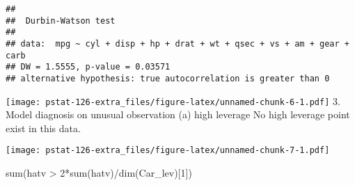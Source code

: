 \documentclass[
]{article}
\newenvironment{Shaded}{\begin{snugshade}}{\end{snugshade}}
\newcommand{\AttributeTok}[1]{\textcolor[rgb]{0.77,0.63,0.00}{#1}}
\newcommand{\ConstantTok}[1]{\textcolor[rgb]{0.00,0.00,0.00}{#1}}
\newcommand{\DecValTok}[1]{\textcolor[rgb]{0.00,0.00,0.81}{#1}}
\newcommand{\FloatTok}[1]{\textcolor[rgb]{0.00,0.00,0.81}{#1}}
\newcommand{\FunctionTok}[1]{\textcolor[rgb]{0.00,0.00,0.00}{#1}}
\newcommand{\NormalTok}[1]{#1}
\newcommand{\OtherTok}[1]{\textcolor[rgb]{0.56,0.35,0.01}{#1}}
\newcommand{\SpecialCharTok}[1]{\textcolor[rgb]{0.00,0.00,0.00}{#1}}
\newcommand{\StringTok}[1]{\textcolor[rgb]{0.31,0.60,0.02}{#1}}
\begin{document}
\begin{verbatim}
## 
##  Durbin-Watson test
## 
## data:  mpg ~ cyl + disp + hp + drat + wt + qsec + vs + am + gear + carb
## DW = 1.5555, p-value = 0.03571
## alternative hypothesis: true autocorrelation is greater than 0
\end{verbatim}

\texttt{[image: pstat-126-extra\_files/figure-latex/unnamed-chunk-6-1.pdf]}
3. Model diagnosis on unusual observation (a) high leverage No high
leverage point exist in this data.

\begin{Shaded}
\end{Shaded}

\texttt{[image: pstat-126-extra\_files/figure-latex/unnamed-chunk-7-1.pdf]}

\begin{Shaded}
\begin{Highlighting}[]
\FunctionTok{sum}\NormalTok{(hatv }\SpecialCharTok{\textgreater{}} \DecValTok{2}\SpecialCharTok{*}\FunctionTok{sum}\NormalTok{(hatv)}\SpecialCharTok{/}\FunctionTok{dim}\NormalTok{(Car\_lev)[}\DecValTok{1}\NormalTok{])}
\end{Highlighting}
\end{Shaded}
\end{document}
